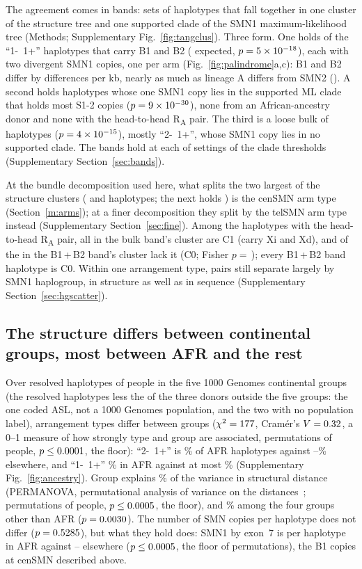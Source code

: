 \documentclass[10pt]{article}
\newcommand{\RU}[1]{R\textsubscript{#1}}%
\begin{document}
The agreement comes in bands: sets of haplotypes that fall together in one cluster of the structure tree and one
supported clade of the SMN1 maximum-likelihood tree (Methods; Supplementary Fig.~\ref{fig:tangclus}). Three form. One
holds \cbABn{} of the \linMixHaps{} ``1-~1+'' haplotypes that carry B1 and B2 (\cbABexp{} expected, $p=5\times10^{-18}$), each
with two divergent SMN1 copies, one per arm (Fig.~\ref{fig:palindrome}a,c): B1 and B2 differ by \gsBoneBtwo{}
differences per kb, nearly as much as lineage A differs from SMN2 (\gsATwo). A second holds \cbTwon{} haplotypes
whose one SMN1 copy lies in the supported ML clade that holds most S1-2 copies ($p=9\times10^{-30}$), none from an African-ancestry donor and none with the head-to-head \RU{A} pair. The third is a loose bulk of
\cbBulkn{} haplotypes ($p=4\times10^{-15}$), mostly ``2-~1+'', whose SMN1 copy lies in no supported clade. The bands hold at each of
\mlbSettings{} settings of the clade thresholds (Supplementary Section~\ref{sec:bands}).

At the bundle decomposition used here, what splits the two largest of the \scN{} structure clusters (\scFirst{} and \scSecond{} haplotypes; the next holds \scThird) is the cenSMN arm type (Section~\ref{m:arms}); at a finer decomposition they split by the telSMN arm type instead (Supplementary Section~\ref{sec:fine}). Among the haplotypes with
the head-to-head \RU{A} pair, all \afBulkPair{} in the bulk band's cluster are C1 (carry Xi and Xd), and \afMixCZero{} of the
\afMixPair{} in the B1\,+\,B2 band's cluster lack it (C0; Fisher $p=$\,\afPC); every B1\,+\,B2 band haplotype is C0.
Within one arrangement type, pairs still separate largely by SMN1 haplogroup, in structure as well as in sequence
(Supplementary Section~\ref{sec:hgscatter}).


\subsection{The structure differs between continental groups, most between AFR and the rest}\label{m:anc}
Over \anHaps{} resolved haplotypes of \anPeople{} people in the five 1000 Genomes continental groups (the resolved haplotypes less the \anLeftOut{} of the three donors outside the five groups: the one coded ASL, not a 1000 Genomes population, and the two with no population label), arrangement
types differ between groups ($\chi^2=177$, Cram\'er's $V=0.32$, a 0--1 measure of how strongly type and group are associated, \anPerm{} permutations of people, $p\le0.0001$, the floor): ``2-~1+'' is
\shTwoMOnePAfr\% of AFR haplotypes against \shTwoMOnePEur--\shTwoMOnePEas\% elsewhere, and ``1-~1+'' \shOneMOnePAfr\%
in AFR against at most \shOneMOnePSas\% (Supplementary Fig.~\ref{fig:ancestry}). Group explains \anRsqAll\% of the
variance in structural distance (PERMANOVA, permutational analysis of variance on the distances~\cite{anderson2001}; \anPermPA{} permutations of people, $p\le0.0005$, the floor), and \anRsqNonAfr\% among the four groups other than AFR
($p=0.0030$). The number of SMN copies per haplotype does not differ ($p=0.5285$), but what they
hold does: SMN1 by exon~7 is \anOneAfr{} per haplotype in AFR against \anOneEas--\anOneSas{} elsewhere
($p\le0.0005$, the floor of \anPermPA{} permutations), the B1 copies at cenSMN described above.
\end{document}
